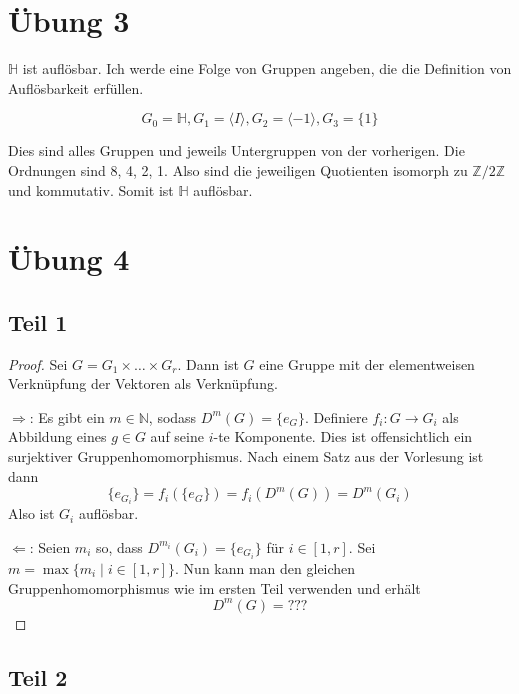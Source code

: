 \documentclass[10pt,a4paper]{article}
\begin{document}
\section{Übung 3}

$\mathbb{H}$ ist auflösbar.
Ich werde eine Folge von Gruppen angeben, die die Definition von Auflösbarkeit erfüllen.

\begin{equation}
  G_{0} = \mathbb{H}, G_{1} = \langle I \rangle, G_{2} = \langle -1 \rangle, G_{3} = \{ 1 \}
\end{equation}

Dies sind alles Gruppen und jeweils Untergruppen von der vorherigen.
Die Ordnungen sind 8, 4, 2, 1.
Also sind die jeweiligen Quotienten isomorph zu $\mathbb{Z} / 2 \mathbb{Z}$ und kommutativ.
Somit ist $\mathbb{H}$ auflösbar.

\section{Übung 4}

\subsection{Teil 1}

\begin{proof}
  Sei $G = G_{1} \times \dots \times G_{r}$.
  Dann ist $G$ eine Gruppe mit der elementweisen Verknüpfung der Vektoren als Verknüpfung.

  $\Rightarrow$: Es gibt ein $m \in \mathbb{N}$, sodass $D^{m}(G) = \{ e_{G} \}$.
  Definiere $f_{i} : G \rightarrow G_{i}$ als Abbildung eines $g \in G$ auf seine $i$-te Komponente.
  Dies ist offensichtlich ein surjektiver Gruppenhomomorphismus.
  Nach einem Satz aus der Vorlesung ist dann
  \begin{equation}
    \{ e_{G_{i}} \} = f_{i}(\{ e_{G} \}) = f_{i}(D^{m}(G)) = D^{m}(G_{i})
  \end{equation}
  Also ist $G_{i}$ auflösbar.

  $\Leftarrow$: Seien $m_{i}$ so, dass $D^{m_{i}}(G_{i}) = \{ e_{G_{i}} \}$ für $i \in [1, r]$.
  Sei $m = \max \{ m_{i} \mid i \in [1, r] \}$.
  Nun kann man den gleichen Gruppenhomomorphismus wie im ersten Teil verwenden und erhält
  \begin{equation}
    D^{m}(G) = ???
  \end{equation}
\end{proof}

\subsection{Teil 2}
\end{document}
